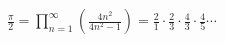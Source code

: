 \documentclass[preview]{standalone}
\begin{document}
\begin{align*}
\frac{\pi}{2} = \prod_{n=1}^{\infty} \left( \frac{4n^2}{4n^2-1} \right) = \frac{2}{1} \cdot \frac{2}{3} \cdot \frac{4}{3} \cdot \frac{4}{5} \cdots
\end{align*}
\end{document}
